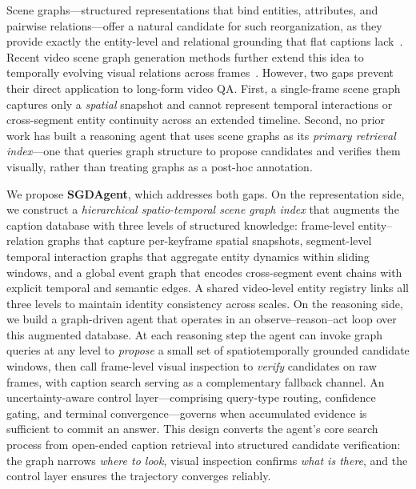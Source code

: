 \documentclass[sigconf, screen, review, anonymous]{acmart}
\begin{document}
Scene graphs---structured representations that bind entities, attributes,
and pairwise relations---offer a natural candidate for such
reorganization, as they provide exactly the entity-level and relational
grounding that flat captions lack~\cite{scenegraph1,scenegraph2}. Recent
video scene graph generation methods further extend this idea to
temporally evolving visual relations across frames~\cite{tpt}.
However, two gaps prevent
their direct application to long-form video QA\@.  First, a single-frame
scene graph captures only a \emph{spatial} snapshot and cannot represent
temporal interactions or cross-segment entity continuity across an extended
timeline.  Second, no prior work has built a reasoning agent that uses
scene graphs as its \emph{primary retrieval index}---one that queries
graph structure to propose candidates and verifies them visually, rather
than treating graphs as a post-hoc annotation.


We propose \textbf{SGDAgent}, which addresses both gaps.  On the
representation side, we construct a \emph{hierarchical spatio-temporal
scene graph index} that augments the caption database with three levels of
structured knowledge: frame-level entity--relation graphs that capture
per-keyframe spatial snapshots, segment-level temporal interaction graphs
that aggregate entity dynamics within sliding windows, and a global event
graph that encodes cross-segment event chains with explicit temporal and
semantic edges.  A shared video-level entity registry links all three levels
to maintain identity consistency across scales.  On the reasoning side, we
build a graph-driven agent that operates in an observe--reason--act loop
over this augmented database.  At each reasoning step the agent can invoke
graph queries at any level to \emph{propose} a small set of
spatiotemporally grounded candidate windows, then call frame-level visual
inspection to \emph{verify} candidates on raw frames, with caption search
serving as a complementary fallback channel.  An uncertainty-aware control
layer---comprising query-type routing, confidence gating, and terminal
convergence---governs when accumulated evidence is sufficient to commit an
answer.  This design converts the agent's core search process from
open-ended caption retrieval into structured candidate verification: the
graph narrows \emph{where to look}, visual inspection confirms \emph{what
is there}, and the control layer ensures the trajectory converges
reliably.
\end{document}
